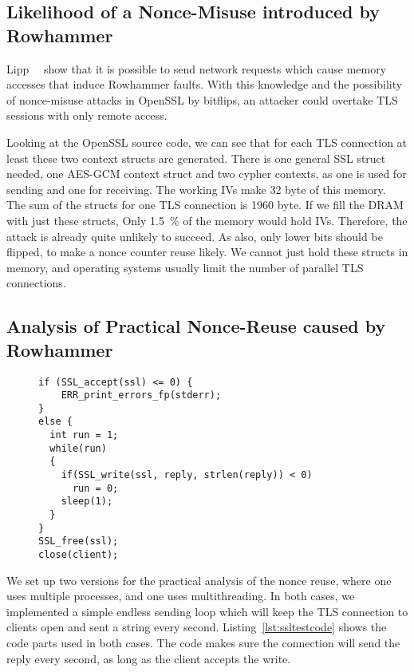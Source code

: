 \subsection{Likelihood of a Nonce-Misuse introduced by Rowhammer}

Lipp~\etal~\cite{nethammer} show that it is possible to send network requests
which cause memory accesses that induce Rowhammer faults. With this knowledge
and the possibility of nonce-misuse attacks in OpenSSL by bitflips, an attacker
could overtake TLS sessions with only remote access.

Looking at the OpenSSL source code, we can see that for each TLS connection at
least these two context structs are generated. There is one general SSL struct
needed, one AES-GCM context struct and two cypher contexts, as one is used for
sending and one for receiving. The working IVs make \num{32} byte of this
memory. The sum of the structs for one TLS connection is \num{1960} byte. If we
fill the DRAM with just these structs, Only \SI{1.5}{\percent} of the memory
would hold IVs. Therefore, the attack is already quite unlikely to succeed. As
also, only lower bits should be flipped, to make a nonce counter reuse
likely. We cannot just hold these structs in memory, and operating
systems usually limit the number of parallel TLS connections.

\subsection{Analysis of Practical Nonce-Reuse caused by Rowhammer}

\begin{figure}
\begin{minipage}{\linewidth}
\begin{lstlisting}[style=CStyle,
                   caption={Code showing an example for a simple TLS server,
keeping sending a reply until the client disconnects.},
                   label={lst:ssltestcode}]
if (SSL_accept(ssl) <= 0) {
    ERR_print_errors_fp(stderr);
}
else {
  int run = 1;
  while(run)
  {
    if(SSL_write(ssl, reply, strlen(reply)) < 0)
      run = 0;
    sleep(1);
  }
}
SSL_free(ssl);
close(client);
\end{lstlisting}
\end{minipage}
\end{figure}

We set up two versions for the practical analysis of the nonce reuse, where one
uses multiple processes, and one uses multithreading. In both cases, we
implemented a simple endless sending loop which will keep the TLS connection to
clients open and sent a string every second. Listing~\ref{lst:ssltestcode}
shows the code parts used in both cases. The code makes sure the connection will
send the reply every second, as long as the client accepts the write.

